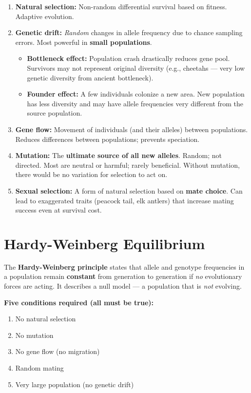 \documentclass[11pt, letterpaper]{article}
\begin{document}
\begin{tcolorbox}[colback=part2bg, colframe=sectiongreen, arc=3pt, boxrule=1pt]
\begin{enumerate}[noitemsep, leftmargin=*]
  \item \textbf{Natural selection:} Non-random differential survival based on fitness. Adaptive evolution.
  \item \textbf{Genetic drift:} \emph{Random} changes in allele frequency due to chance sampling errors. Most powerful in \textbf{small populations}.
    \begin{itemize}[noitemsep]
      \item \textbf{Bottleneck effect:} Population crash drastically reduces gene pool. Survivors may not represent original diversity (e.g., cheetahs --- very low genetic diversity from ancient bottleneck).
      \item \textbf{Founder effect:} A few individuals colonize a new area. New population has less diversity and may have allele frequencies very different from the source population.
    \end{itemize}
  \item \textbf{Gene flow:} Movement of individuals (and their alleles) between populations. Reduces differences between populations; prevents speciation.
  \item \textbf{Mutation:} The \textbf{ultimate source of all new alleles}. Random; not directed. Most are neutral or harmful; rarely beneficial. Without mutation, there would be no variation for selection to act on.
  \item \textbf{Sexual selection:} A form of natural selection based on \textbf{mate choice}. Can lead to exaggerated traits (peacock tail, elk antlers) that increase mating success even at survival cost.
\end{enumerate}
\end{tcolorbox}

\section*{Hardy-Weinberg Equilibrium}

The \textbf{Hardy-Weinberg principle} states that allele and genotype frequencies in a
population remain \textbf{constant} from generation to generation if \emph{no} evolutionary
forces are acting. It describes a null model --- a population that is \emph{not} evolving.

\textbf{Five conditions required (all must be true):}
\begin{enumerate}[noitemsep]
  \item No natural selection
  \item No mutation
  \item No gene flow (no migration)
  \item Random mating
  \item Very large population (no genetic drift)
\end{enumerate}
\end{document}
